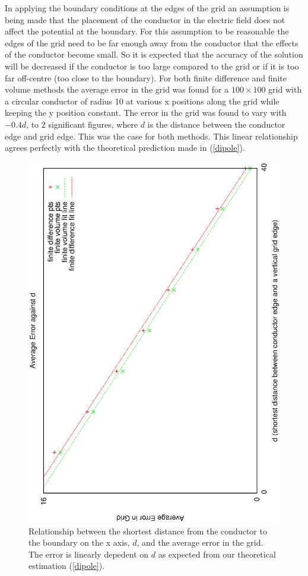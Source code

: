 \documentclass[aps,twocolumn,pre,nofootinbib,10pt]{revtex4-1}
\begin{document}
In applying the boundary conditions at the edges of the grid an assumption is being made that the placement of the conductor in the electric field does not affect the potential at the boundary. For this assumption to be reasonable the edges of the grid need to be far enough away from the conductor that the effects of the conductor become small. So it is expected that the accuracy of the solution will be decreased if the conductor is too large compared to the grid or if it is too far off-centre (too close to the boundary). For both finite difference and finite volume methods the average error in the grid was found for a $100 \times 100$ grid with a circular conductor of radius 10 at various x positions along the grid while keeping the y position constant. The error in the grid was found to vary with \(-0.4d\), to 2 significant figures, where $d$ is the distance between the conductor edge and grid edge. This was the case for both methods. This linear relationship agrees perfectly with the theoretical 
prediction made in (\ref{dipole}).

\begin{figure}
\includegraphics[height=\breite \columnwidth,angle=-90]{position.eps}
\caption{Relationship between the shortest distance from the conductor to the boundary on the x axis, $d$, and the average error in the grid. The error is linearly depedent on $d$ as expected from our theoretical estimation (\ref{dipole}).}
\label{fig:fd_distance}
\end{figure}
\end{document}
